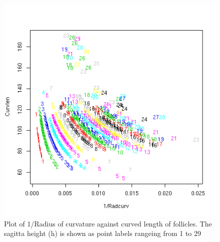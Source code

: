 %

\begin{figure}[!h]
  \centering
  \includegraphics[width=1.0\textwidth]{curvxcurvlenxh.png}
  \caption{Plot of  1/Radius of curvature against curved length of follicles. The sagitta height (h) is shown as point labels rangeing from 1 to 29}
  \label{fig:curvxcurvlenxh}
\end{figure}

%

